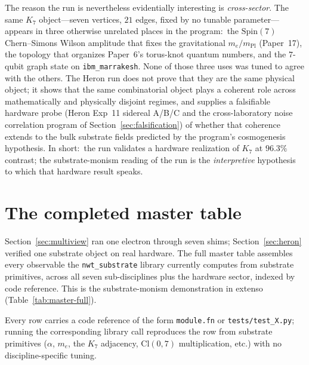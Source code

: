 \documentclass[11pt]{article}
\newcommand{\Spin}{\mathrm{Spin}}
\newcommand{\mPl}{m_{\mathrm{Pl}}}
\newcommand{\me}{m_e}
\newcommand{\nwtsub}{\texttt{nwt\_substrate}}
\begin{document}
The reason the run is nevertheless evidentially interesting is
\emph{cross-sector}.  The same $K_7$ object---seven vertices,
$21$ edges, fixed by no tunable parameter---appears in three
otherwise unrelated places in the program:\ the $\Spin(7)$
Chern--Simons Wilson amplitude that fixes the gravitational
$\me/\mPl$ (Paper~17), the topology that organizes Paper~6's
torus-knot quantum numbers, and the $7$-qubit graph state on
\texttt{ibm\_marrakesh}.  None of those three uses was tuned to
agree with the others.  The Heron run does not prove that they
are the same physical object; it shows that the same
combinatorial object plays a coherent role across
mathematically and physically disjoint regimes, and supplies a
falsifiable hardware probe (Heron Exp~11 sidereal A/B/C and the
cross-laboratory noise correlation program of
Section~\ref{sec:falsification}) of whether that coherence
extends to the bulk substrate fields predicted by the program's
cosmogenesis hypothesis.  In short:\ the run validates a
hardware realization of $K_7$ at $96.3\%$ contrast; the
substrate-monism reading of the run is the \emph{interpretive}
hypothesis to which that hardware result speaks.

\section{The completed master table}
\label{sec:master}

Section~\ref{sec:multiview} ran one electron through seven shims;
Section~\ref{sec:heron} verified one substrate object on real
hardware.  The full master table assembles every observable the
\nwtsub{} library currently computes from substrate primitives,
across all seven sub-disciplines plus the hardware sector,
indexed by code reference.  This is the substrate-monism
demonstration in extenso (Table~\ref{tab:master-full}).

Every row carries a code reference of the form \texttt{module.fn}
or \texttt{tests/test\_X.py}; running the corresponding library
call reproduces the row from substrate primitives ($\alpha$,
$\me$, the $K_7$ adjacency, $\mathrm{Cl}(0,7)$ multiplication,
etc.) with no discipline-specific tuning.
\end{document}
